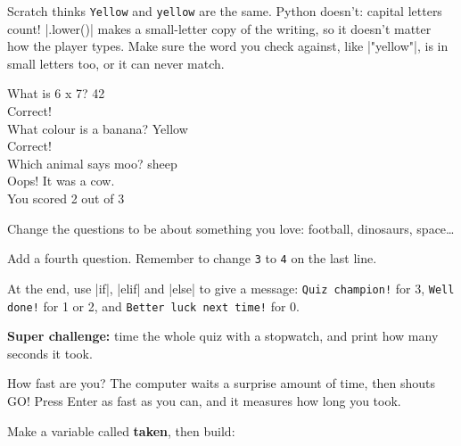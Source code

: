 \begin{watchout}
Scratch thinks \texttt{Yellow} and \texttt{yellow} are the same. Python doesn't: capital letters count! \py|.lower()| makes a small-letter copy of the writing, so it doesn't matter how the player types. Make sure the word you check against, like \py|"yellow"|, is in small letters too, or it can never match.
\end{watchout}


\begin{outputbox}
What is 6 x 7? 42\\
Correct!\\
What colour is a banana? Yellow\\
Correct!\\
Which animal says moo? sheep\\
Oops! It was a cow.\\
You scored 2 out of 3
\end{outputbox}

\begin{challenge}
\tick Change the questions to be about something you love: football, dinosaurs, space\ldots\par
\tick Add a fourth question. Remember to change \texttt{3} to \texttt{4} on the last line.\par
\tick At the end, use \py|if|, \py|elif| and \py|else| to give a message: \texttt{Quiz champion!} for 3, \texttt{Well done!} for 1 or 2, and \texttt{Better luck next time!} for 0.\par
\tick \textbf{Super challenge:} time the whole quiz with a stopwatch, and print how many seconds it took.
\end{challenge}


How fast are you? The computer waits a surprise amount of time, then shouts GO! Press Enter as fast as you can, and it measures how long you took.

Make a variable called \textbf{taken}, then build:

\begin{center}
\begin{scratch}
\end{scratch}
\end{center}

